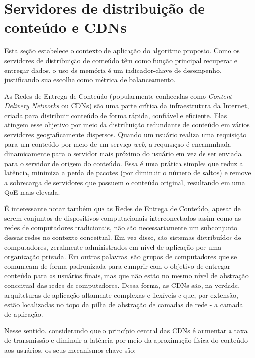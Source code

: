\section{Servidores de distribuição de conteúdo e CDNs}

Esta seção estabelece o contexto de aplicação do algoritmo proposto. Como os servidores de distribuição de conteúdo têm como função principal recuperar e entregar dados, o uso de memória é um indicador-chave de desempenho, justificando sua escolha como métrica de balanceamento.

As Redes de Entrega de Conteúdo (popularmente conhecidas como \textit{Content Delivery Networks} ou CDNs) são uma parte crítica da infraestrutura da Internet, criada para distribuir conteúdo de forma rápida, confiável e eficiente. Elas atingem esse objetivo por meio da distribuição redundante de conteúdo em vários servidores geograficamente dispersos. Quando um usuário realiza uma requisição para um conteúdo por meio de um serviço \textit{web}, a requisição é encaminhada dinamicamente para o servidor mais próximo do usuário em vez de ser enviada para o servidor de origem do conteúdo. Essa é uma prática simples que reduz a latência, minimiza a perda de pacotes (por diminuir o número de saltos) e remove a sobrecarga de servidores que possuem o conteúdo original, resultando em uma QoE mais elevada.

É interessante notar também que as Redes de Entrega de Conteúdo, apesar de serem conjuntos de dispositivos computacionais interconectados assim como as redes de computadores tradicionais, não são necessariamente um subconjunto dessas redes no contexto conceitual. Em vez disso, são sistemas distribuídos de computadores, geralmente administrados em nível de aplicação por uma organização privada. Em outras palavras, são grupos de computadores que se comunicam de forma padronizada para cumprir com o objetivo de entregar conteúdo para os usuários finais, mas que não estão no mesmo nível de abstração conceitual das redes de computadores. Dessa forma, as CDNs são, na verdade, arquiteturas de aplicação altamente complexas e flexíveis e que, por extensão, estão localizadas no topo da pilha de abstração de camadas de rede - a camada de aplicação.

Nesse sentido, considerando que o princípio central das CDNs é aumentar a taxa de transmissão e diminuir a latência por meio da aproximação física do conteúdo aos usuários, os seus mecanismos-chave são:

